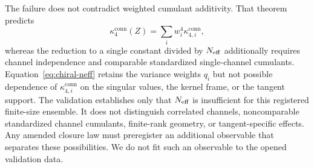 The failure does not contradict weighted cumulant additivity.  That theorem predicts
\begin{equation}
 \kappa_4^{\mathrm{conn}}(Z)=\sum_i w_i^4\kappa_{4,i}^{\mathrm{conn}},
 \label{eq:chiral-general-weighted-law}
\end{equation}
whereas the reduction to a single constant divided by $N_{\rm eff}$ additionally requires channel independence and comparable standardized single-channel cumulants.  Equation~\eqref{eq:chiral-neff} retains the variance weights $q_i$ but not possible dependence of $\kappa_{4,i}^{\mathrm{conn}}$ on the singular values, the kernel frame, or the tangent support.  The validation establishes only that $N_{\rm eff}$ is insufficient for this registered finite-size ensemble.  It does not distinguish correlated channels, noncomparable standardized channel cumulants, finite-rank geometry, or tangent-specific effects.  Any amended closure law must preregister an additional observable that separates these possibilities.  We do not fit such an observable to the opened validation data.
